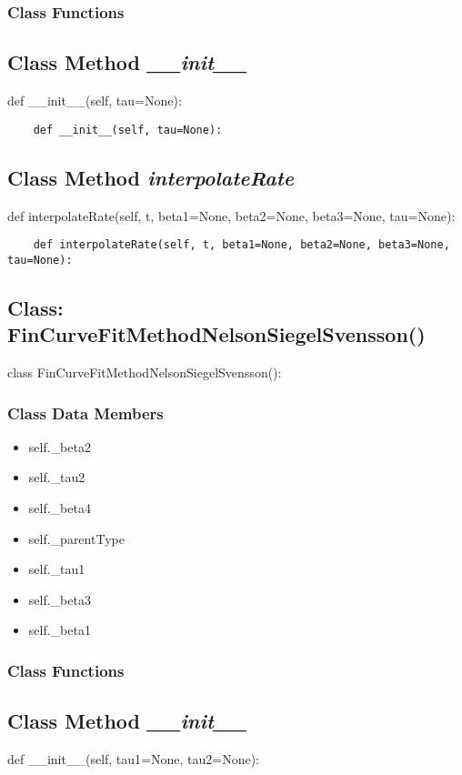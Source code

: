 \documentclass[twoside,11pt]{book}
\begin{document}
\subsubsection{Class Functions}

\subsection{Class Method {\it \_\_init\_\_}}
def \_\_init\_\_(self, tau=None):

\begin{lstlisting}
    def __init__(self, tau=None):
\end{lstlisting}

\subsection{Class Method {\it interpolateRate}}
def interpolateRate(self, t, beta1=None, beta2=None, beta3=None, tau=None):

\begin{lstlisting}
    def interpolateRate(self, t, beta1=None, beta2=None, beta3=None, tau=None):
\end{lstlisting}

\subsection{Class: FinCurveFitMethodNelsonSiegelSvensson()}
class FinCurveFitMethodNelsonSiegelSvensson():

\subsubsection{Class Data Members}
\begin{itemize}
\item{self.\_beta2}
\item{self.\_tau2}
\item{self.\_beta4}
\item{self.\_parentType}
\item{self.\_tau1}
\item{self.\_beta3}
\item{self.\_beta1}
\end{itemize}

\subsubsection{Class Functions}

\subsection{Class Method {\it \_\_init\_\_}}
def \_\_init\_\_(self, tau1=None, tau2=None):
\end{document}
